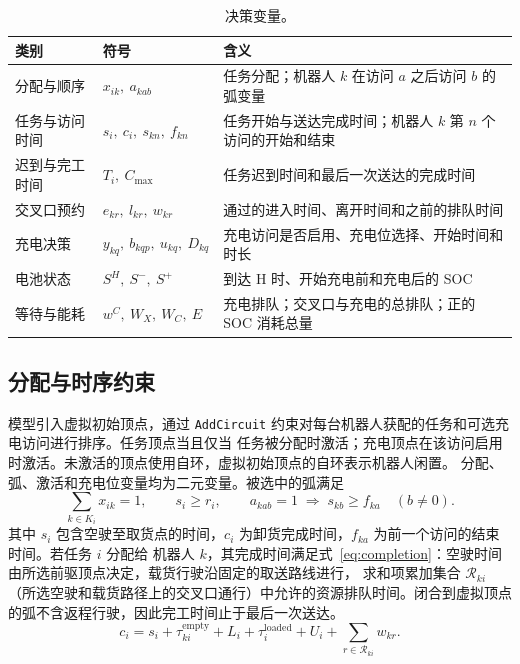 \documentclass[11pt,a4paper,fontset=none]{ctexart}
\newcommand{\code}[1]{\texttt{#1}}
\begin{document}
\begin{table}[!htbp]
\centering\small
\caption{决策变量。}
\label{tab:vars}
\begin{tabularx}{0.92\linewidth}{llX}
\toprule
类别 & 符号 & 含义 \\
\midrule
分配与顺序 & $x_{ik},\ a_{kab}$ & 任务分配；机器人 $k$ 在访问 $a$ 之后访问 $b$ 的弧变量 \\
任务与访问时间 & $s_i,\ c_i,\ s_{kn},\ f_{kn}$ & 任务开始与送达完成时间；机器人 $k$ 第 $n$ 个访问的开始和结束 \\
迟到与完工时间 & $T_i,\ C_{\max}$ & 任务迟到时间和最后一次送达的完成时间 \\
交叉口预约 & $e_{kr},\ l_{kr},\ w_{kr}$ & 通过的进入时间、离开时间和之前的排队时间 \\
充电决策 & $y_{kq},\ b_{kqp},\ u_{kq},\ D_{kq}$ & 充电访问是否启用、充电位选择、开始时间和时长 \\
电池状态 & $S^{H},\ S^{-},\ S^{+}$ & 到达 H 时、开始充电前和充电后的 SOC \\
等待与能耗 & $w^{C},\ W_X,\ W_C,\ E$ & 充电排队；交叉口与充电的总排队；正的 SOC 消耗总量 \\
\bottomrule
\end{tabularx}
\end{table}

\subsection{分配与时序约束}

模型引入虚拟初始顶点，通过 \code{AddCircuit} 约束对每台机器人获配的任务和可选充电访问进行排序。任务顶点当且仅当
任务被分配时激活；充电顶点在该访问启用时激活。未激活的顶点使用自环，虚拟初始顶点的自环表示机器人闲置。
分配、弧、激活和充电位变量均为二元变量。被选中的弧满足
\begin{equation}
\sum_{k \in K_i} x_{ik} = 1, \qquad s_i \ge r_i, \qquad
a_{kab} = 1 \;\Rightarrow\; s_{kb} \ge f_{ka} \quad (b \ne 0).
\label{eq:assign}
\end{equation}
其中 $s_i$ 包含空驶至取货点的时间，$c_i$ 为卸货完成时间，$f_{ka}$ 为前一个访问的结束时间。若任务 $i$ 分配给
机器人 $k$，其完成时间满足式~\eqref{eq:completion}：空驶时间由所选前驱顶点决定，载货行驶沿固定的取送路线进行，
求和项累加集合 $\mathcal{R}_{ki}$（所选空驶和载货路径上的交叉口通行）中允许的资源排队时间。闭合到虚拟顶点
的弧不含返程行驶，因此完工时间止于最后一次送达。
\begin{equation}
c_i = s_i + \tau^{\text{empty}}_{ki} + L_i + \tau^{\text{loaded}}_{i} + U_i
  + \sum_{r \in \mathcal{R}_{ki}} w_{kr}.
\label{eq:completion}
\end{equation}
\end{document}
